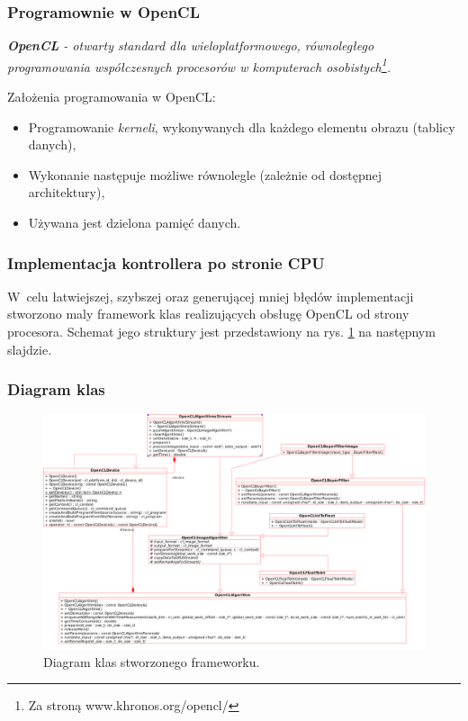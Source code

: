 \documentclass{beamer}
\begin{document}
\begin{frame}
	\frametitle{Programownie w OpenCL}
	
	\emph{\textbf{OpenCL} - otwarty standard dla wieloplatformowego, równoległego programowania współczesnych procesorów w komputerach osobistych\footnote{Za stroną www.khronos.org/opencl/}.}
	
	\vspace{1em}
	
	Założenia programowania w OpenCL:
	
	\begin{itemize}
	\item Programowanie \emph{kerneli}, wykonywanych dla każdego elementu obrazu (tablicy danych),
	\item Wykonanie następuje możliwe równolegle (zależnie od dostępnej architektury),
	\item Używana jest dzielona pamięć danych.
  \end{itemize}
\end{frame}

\begin{frame}
  \frametitle{Implementacja kontrollera po stronie CPU}
  W~celu łatwiejszej, szybszej oraz generującej mniej błędów implementacji stworzono maly framework klas realizujących obsługę OpenCL od strony procesora.
Schemat jego struktury jest przedstawiony na rys. \ref{fig:class_diagram} na następnym slajdzie.
\end{frame}

\begin{frame}
  \frametitle{Diagram klas}
\begin{figure}
  \centering
  \includegraphics[width=0.8\linewidth]{class_diagram}
  \caption{Diagram klas stworzonego frameworku.}
  \label{fig:class_diagram}
\end{figure}
  
\end{frame}
\end{document}
